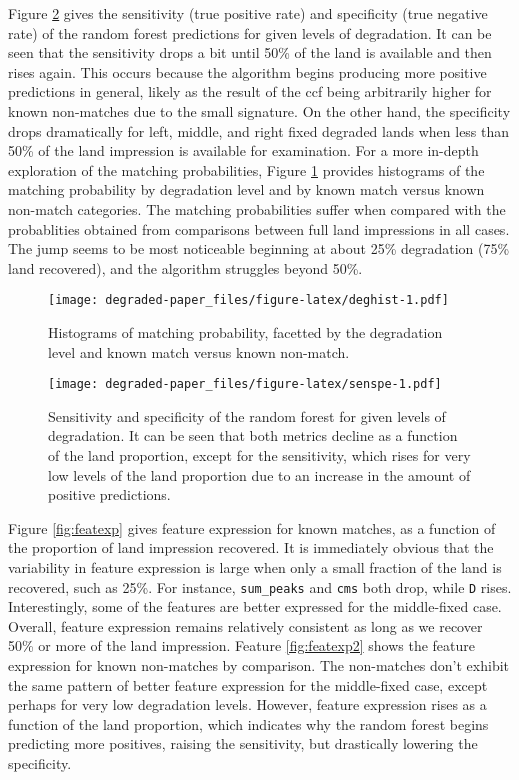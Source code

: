 \documentclass[12pt,]{article}
\theoremstyle{definition}
\theoremstyle{definition}
\theoremstyle{definition}
\theoremstyle{remark}
\begin{document}
Figure \ref{fig:senspe} gives the sensitivity (true positive rate) and
specificity (true negative rate) of the random forest predictions for
given levels of degradation. It can be seen that the sensitivity drops a
bit until 50\% of the land is available and then rises again. This
occurs because the algorithm begins producing more positive predictions
in general, likely as the result of the ccf being arbitrarily higher for
known non-matches due to the small signature. On the other hand, the
specificity drops dramatically for left, middle, and right fixed
degraded lands when less than 50\% of the land impression is available
for examination. For a more in-depth exploration of the matching
probabilities, Figure \ref{fig:deghist} provides histograms of the
matching probability by degradation level and by known match versus
known non-match categories. The matching probabilities suffer when
compared with the probablities obtained from comparisons between full
land impressions in all cases. The jump seems to be most noticeable
beginning at about 25\% degradation (75\% land recovered), and the
algorithm struggles beyond 50\%.

\begin{figure}[htbp]
\centering
\texttt{[image: degraded-paper\_files/figure-latex/deghist-1.pdf]}
\caption{\label{fig:deghist}Histograms of matching probability, facetted by
the degradation level and known match versus known non-match.}
\end{figure}

\begin{figure}[htbp]
\centering
\texttt{[image: degraded-paper\_files/figure-latex/senspe-1.pdf]}
\caption{\label{fig:senspe}Sensitivity and specificity of the random forest
for given levels of degradation. It can be seen that both metrics
decline as a function of the land proportion, except for the
sensitivity, which rises for very low levels of the land proportion due
to an increase in the amount of positive predictions.}
\end{figure}

Figure \ref{fig:featexp} gives feature expression for known matches, as
a function of the proportion of land impression recovered. It is
immediately obvious that the variability in feature expression is large
when only a small fraction of the land is recovered, such as 25\%. For
instance, \texttt{sum\_peaks} and \texttt{cms} both drop, while
\texttt{D} rises. Interestingly, some of the features are better
expressed for the middle-fixed case. Overall, feature expression remains
relatively consistent as long as we recover 50\% or more of the land
impression. Feature \ref{fig:featexp2} shows the feature expression for
known non-matches by comparison. The non-matches don't exhibit the same
pattern of better feature expression for the middle-fixed case, except
perhaps for very low degradation levels. However, feature expression
rises as a function of the land proportion, which indicates why the
random forest begins predicting more positives, raising the sensitivity,
but drastically lowering the specificity.
\end{document}
